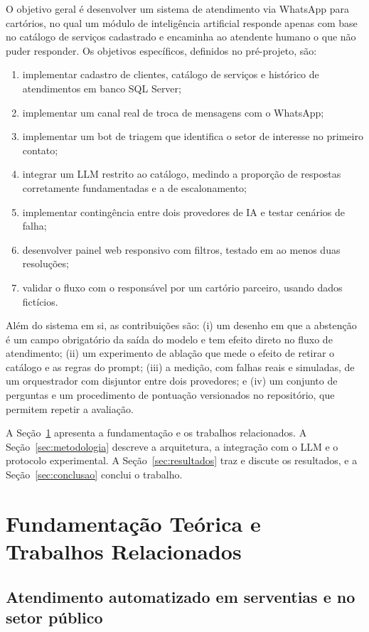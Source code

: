 \documentclass[conference]{IEEEtran}
\begin{document}
O objetivo geral é desenvolver um sistema de atendimento via WhatsApp para cartórios, no qual um módulo de inteligência artificial responde apenas com base no catálogo de serviços cadastrado e encaminha ao atendente humano o que não puder responder. Os objetivos específicos, definidos no pré-projeto, são:
\begin{enumerate}
\item implementar cadastro de clientes, catálogo de serviços e histórico de atendimentos em banco SQL Server;
\item implementar um canal real de troca de mensagens com o WhatsApp;
\item implementar um bot de triagem que identifica o setor de interesse no primeiro contato;
\item integrar um LLM restrito ao catálogo, medindo a proporção de respostas corretamente fundamentadas e a de escalonamento;
\item implementar contingência entre dois provedores de IA e testar cenários de falha;
\item desenvolver painel web responsivo com filtros, testado em ao menos duas resoluções;
\item validar o fluxo com o responsável por um cartório parceiro, usando dados fictícios.
\end{enumerate}

Além do sistema em si, as contribuições são: (i) um desenho em que a abstenção é um campo obrigatório da saída do modelo e tem efeito direto no fluxo de atendimento; (ii) um experimento de ablação que mede o efeito de retirar o catálogo e as regras do prompt; (iii) a medição, com falhas reais e simuladas, de um orquestrador com disjuntor entre dois provedores; e (iv) um conjunto de perguntas e um procedimento de pontuação versionados no repositório, que permitem repetir a avaliação.

A Seção~\ref{sec:fundamentacao} apresenta a fundamentação e os trabalhos relacionados. A Seção~\ref{sec:metodologia} descreve a arquitetura, a integração com o LLM e o protocolo experimental. A Seção~\ref{sec:resultados} traz e discute os resultados, e a Seção~\ref{sec:conclusao} conclui o trabalho.

\section{Fundamentação Teórica e Trabalhos Relacionados}\label{sec:fundamentacao}

\subsection{Atendimento automatizado em serventias e no setor público}
\end{document}
